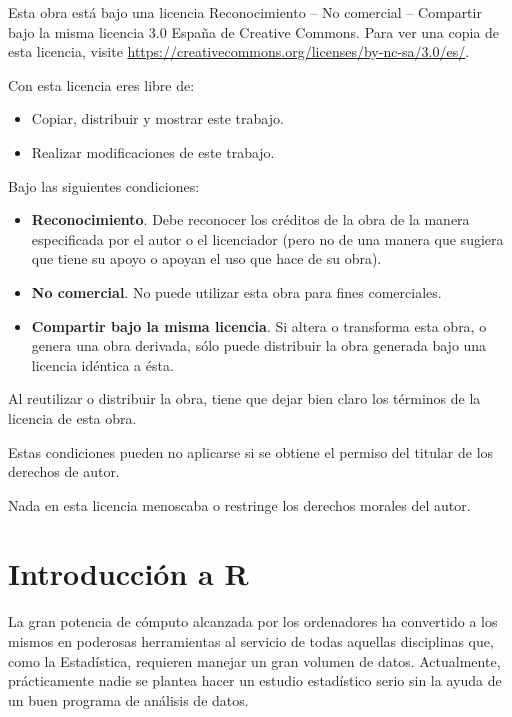 \documentclass[
  a4paper,
]{scrreport}
\providecommand{\tightlist}{%
  \setlength{\itemsep}{0pt}\setlength{\parskip}{0pt}}\usepackage{longtable,booktabs,array}
\theoremstyle{definition}
\theoremstyle{remark}
\begin{document}

Esta obra está bajo una licencia Reconocimiento -- No comercial --
Compartir bajo la misma licencia 3.0 España de Creative Commons. Para
ver una copia de esta licencia, visite
\url{https://creativecommons.org/licenses/by-nc-sa/3.0/es/}.

Con esta licencia eres libre de:

\begin{itemize}
\tightlist
\item
  Copiar, distribuir y mostrar este trabajo.
\item
  Realizar modificaciones de este trabajo.
\end{itemize}

Bajo las siguientes condiciones:

\begin{itemize}
\item
  \textbf{Reconocimiento}. Debe reconocer los créditos de la obra de la
  manera especificada por el autor o el licenciador (pero no de una
  manera que sugiera que tiene su apoyo o apoyan el uso que hace de su
  obra).
\item
  \textbf{No comercial}. No puede utilizar esta obra para fines
  comerciales.
\item
  \textbf{Compartir bajo la misma licencia}. Si altera o transforma esta
  obra, o genera una obra derivada, sólo puede distribuir la obra
  generada bajo una licencia idéntica a ésta.
\end{itemize}

Al reutilizar o distribuir la obra, tiene que dejar bien claro los
términos de la licencia de esta obra.

Estas condiciones pueden no aplicarse si se obtiene el permiso del
titular de los derechos de autor.

Nada en esta licencia menoscaba o restringe los derechos morales del
autor.


\chapter{Introducción a R}\label{introducciuxf3n-a-r}

La gran potencia de cómputo alcanzada por los ordenadores ha convertido
a los mismos en poderosas herramientas al servicio de todas aquellas
disciplinas que, como la Estadística, requieren manejar un gran volumen
de datos. Actualmente, prácticamente nadie se plantea hacer un estudio
estadístico serio sin la ayuda de un buen programa de análisis de datos.
\end{document}
